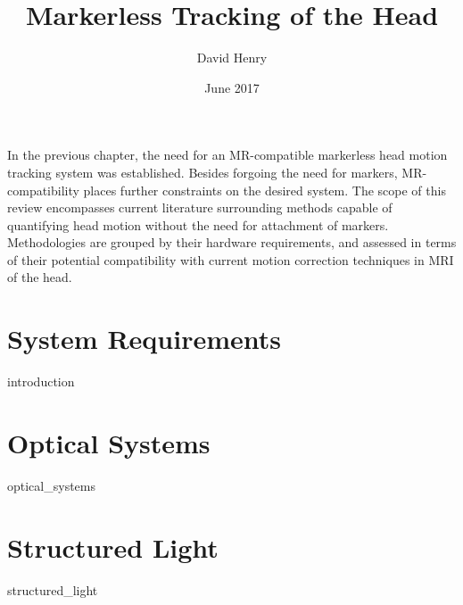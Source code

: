 \documentclass{article}
\title{Markerless Tracking of the Head}
\author{David Henry}
\date{June 2017}
\begin{document}
\maketitle
In the previous chapter, the need for an MR-compatible markerless head motion tracking system was established. Besides forgoing the need for markers, MR-compatibility places further constraints on the desired system. The scope of this review encompasses current literature surrounding methods capable of quantifying head motion without the need for attachment of markers. Methodologies are grouped by their hardware requirements, and assessed in terms of their potential compatibility with current motion correction techniques in MRI of the head.


\section{System Requirements} \label{Section1}
{introduction}

\section{Optical Systems} \label{Section2}
{optical_systems}

\section{Structured Light} \label{Section3}
{structured_light}


\printbibliography
\end{document}
